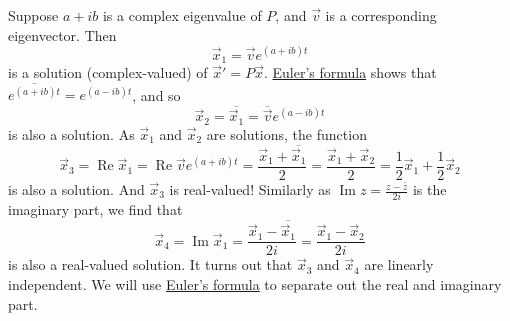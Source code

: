 Suppose $a + ib$ is a complex eigenvalue of $P$, and $\vec{v}$
is a corresponding eigenvector.  Then
\begin{equation*}
\vec{x}_1 = \vec{v} e^{(a+ib)t}
\end{equation*}
is a solution (complex-valued) of
${\vec{x}}' = P \vec{x}$.  \hyperref[eulersformula]{Euler's formula}
shows that $\overline{e^{(a+ib)t}} =
e^{(a-ib)t}$,
and so
\begin{equation*}
\vec{x}_2 = \overline{\vec{x}_1} = \overline{\vec{v}} e^{(a-ib)t}
\end{equation*}
is also a solution.
As $\vec{x}_1$ and $\vec{x}_2$ are solutions, the function
\begin{equation*}
\vec{x}_3 =
\operatorname{Re} \vec{x}_1 =
\operatorname{Re} \vec{v} e^{(a+ib)t} =
\frac{\vec{x}_1 + \overline{\vec{x}_1}}{2}  =
\frac{\vec{x}_1 + \vec{x}_2}{2} 
=
\frac{1}{2} \vec{x}_1 + \frac{1}{2}\vec{x}_2
\end{equation*}
is also a solution.  And $\vec{x}_3$ is real-valued!  Similarly as
$\operatorname{Im} z = \frac{z-\bar{z}}{2i}$ is the imaginary part, we find
that
\begin{equation*}
\vec{x}_4 =
\operatorname{Im} \vec{x}_1 =
\frac{\vec{x}_1 - \overline{\vec{x}_1}}{2i}  =
\frac{\vec{x}_1 - \vec{x}_2}{2i}
\end{equation*}
is also a real-valued solution.  It turns out that $\vec{x}_3$ and
$\vec{x}_4$ are linearly independent.
We will use \hyperref[eulersformula]{Euler's formula}
to separate out the real and imaginary part.

\medskip

